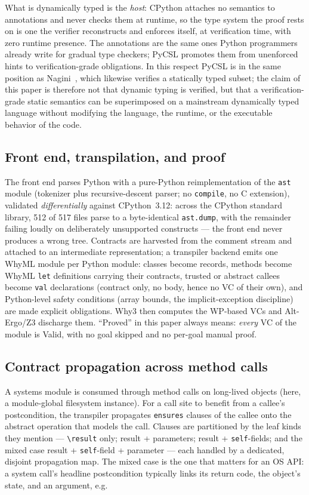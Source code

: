 \documentclass[11pt]{article}
\newcommand{\pycsl}{\textsf{PyCSL}}
\newcommand{\whyml}{\textsf{WhyML}}
\newcommand{\why}{\textsf{Why3}}
\newcommand{\altergo}{\textsf{Alt-Ergo}}
\newcommand{\zthree}{\textsf{Z3}}
\begin{document}
What is dynamically typed is the \emph{host}: CPython attaches no semantics
to annotations and never checks them at runtime, so the type system the
proof rests on is one the verifier reconstructs and enforces itself, at
verification time, with zero runtime presence. The annotations are the same
ones Python programmers already write for gradual type checkers; \pycsl{}
promotes them from unenforced hints to verification-grade obligations. In
this respect \pycsl{} is in the same position as Nagini~\cite{nagini},
which likewise verifies a statically typed subset; the claim of this paper
is therefore not that dynamic typing is verified, but that a
verification-grade static semantics can be superimposed on a mainstream
dynamically typed language without modifying the language, the runtime, or
the executable behavior of the code.

\subsection{Front end, transpilation, and proof}

The front end parses Python with a pure-Python reimplementation of the
\texttt{ast} module (tokenizer plus recursive-descent parser; no
\texttt{compile}, no C extension), validated \emph{differentially} against
CPython~3.12: across the CPython standard library, 512 of 517 files parse to
a byte-identical \texttt{ast.dump}, with the remainder failing loudly on
deliberately unsupported constructs --- the front end never produces a wrong
tree. Contracts are harvested from the comment stream and attached to an
intermediate representation; a transpiler backend emits one \whyml{}
module per Python module: classes become records, methods become \whyml{}
\texttt{let} definitions carrying their contracts, trusted or abstract
callees become \texttt{val} declarations (contract only, no body, hence no
VC of their own), and Python-level safety conditions (array bounds, the
implicit-exception discipline) are made explicit obligations. \why{} then
computes the WP-based VCs and \altergo{}/\zthree{} discharge them. ``Proved''
in this paper always means: \emph{every} VC of the module is Valid, with no
goal skipped and no per-goal manual proof.

\subsection{Contract propagation across method calls}\label{sec:fourmaps}

A systems module is consumed through method calls on long-lived objects
(here, a module-global filesystem instance). For a call site to benefit from
a callee's postcondition, the transpiler propagates \texttt{ensures} clauses
of the callee onto the abstract operation that models the call. Clauses are
partitioned by the leaf kinds they mention --- \texttt{\textbackslash result}
only; result + parameters; result + \texttt{self}-fields; and the mixed case
result + \texttt{self}-field + parameter --- each handled by a dedicated,
disjoint propagation map. The mixed case is the one that matters for an OS
API: a system call's headline postcondition typically links its return code,
the object's state, and an argument, e.g.
\end{document}
